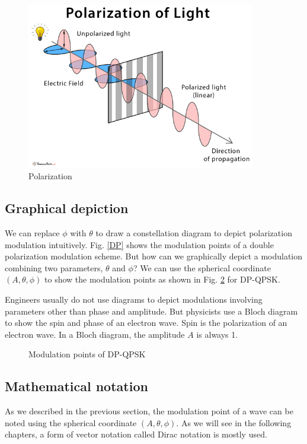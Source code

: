 \documentclass[Letter,11pt]{book}
\begin{document}
\begin{figure}[ht]
\includegraphics[width=10cm]{pic/Polarization-of-Light.jpg}
\caption{Polarization}
\label{Polarization}
\end{figure}

\subsection{Graphical depiction}
We can replace $\phi$ with $\theta$ to draw a constellation diagram to depict polarization modulation intuitively. Fig. \ref{DP} shows the modulation points of a double polarization modulation scheme. But how can we graphically depict a modulation combining two parameters, $\theta$ and $\phi$? We can use the spherical coordinate $(A, \theta, \phi)$ to show the modulation points as shown in Fig. \ref{DP-QPSK} for DP-QPSK.

Engineers usually do not use diagrams to depict modulations involving parameters other than phase and amplitude. But physicists use a Bloch diagram to show the spin and phase of an electron wave. Spin is the polarization of an electron wave. In a Bloch diagram, the amplitude $A$ is always 1.

\begin{figure}[ht]\label{DP-QPSK}

\caption{Modulation points of DP-QPSK}
\end{figure}

\subsection{Mathematical notation}
As we described in the previous section, the modulation point of a wave can be noted using the spherical coordinate $(A, \theta, \phi)$. As we will see in the following chapters, a form of vector notation called Dirac notation is mostly used.
\end{document}
